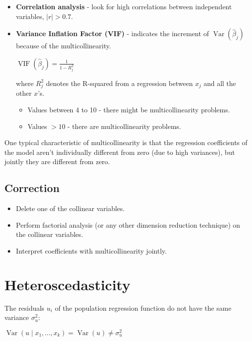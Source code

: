 \documentclass[10pt, a4paper, landscape]{article}
\DeclareMathOperator{\Var}{Var}
\begin{document}
\begin{multicols}{3}
\begin{itemize}[leftmargin=*]
	\item \textbf{Correlation analysis} - look for high correlations between independent variables, \( \lvert r \rvert > 0.7 \).
	\item \textbf{Variance Inflation Factor (VIF)} - indicates the increment of \( \Var(\hat{\beta}_{j}) \) because of the multicollinearity.
	\begin{center}
		\( \operatorname{VIF}(\hat{\beta}_{j}) = \frac{1}{1 - R_{j}^{2}} \)
	\end{center}
	where \( R_{j}^{2} \) denotes the R-squared from a regression between \( x_{j} \) and all the other \( x \)'s.
	\begin{itemize}[leftmargin=*]
		\item Values between 4 to 10 - there might be multicollinearity problems.
		\item Values \( > 10 \) - there are multicollinearity problems.
	\end{itemize}
\end{itemize}

One typical characteristic of multicollinearity is that the regression coefficients of the model aren't individually different from zero (due to high variances), but jointly they are different from zero.

\subsection*{Correction}

\begin{itemize}[leftmargin=*]
	\item Delete one of the collinear variables.
	\item Perform factorial analysis (or any other dimension reduction technique) on the collinear variables.
	\item Interpret coefficients with multicollinearity jointly.
\end{itemize}

\columnbreak

\section*{Heteroscedasticity}

The residuals \( u_{i} \) of the population regression function do not have the same variance \( \sigma_{u}^{2} \):

\begin{center}
	\( \Var(u \mid x_{1}, \ldots, x_{k}) = \Var(u) \neq \sigma_{u}^{2} \)
\end{center}


\end{multicols}
\end{document}
